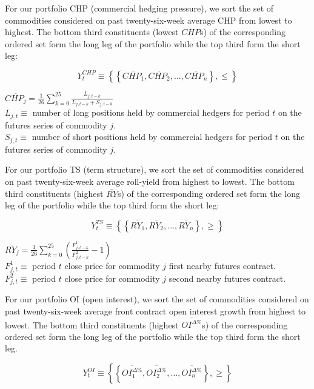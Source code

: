 \documentclass[
  authoryear,
  preprint,
  3p]{elsarticle}
\begin{document}
\medskip

For our portfolio CHP (commercial hedging pressure), we sort the set of
commodities considered on past twenty-six-week average CHP from lowest
to highest. The bottom third constituents (lowest \(\overline{CHP}\)s)
of the corresponding ordered set form the long leg of the portfolio
while the top third form the short leg:

\[Y_{t}^{CHP}\equiv\left \{ \left \{ \overline{CHP_{1}}, \overline{CHP_{2}}, ..., \overline{CHP_{n}} \right \}, \leq \right \}\]

\(\overline{CHP_{j}}=\frac{1}{26}\sum_{k=0}^{25}\frac{L_{j,t-k}}{L_{j,t-k}+S_{j,t-k}}\)\\
\(L_{j,t}\equiv\) number of long positions held by commercial hedgers
for period \(t\) on the futures series of commodity \(j\).\\
\(S_{j,t}\equiv\) number of short positions held by commercial hedgers
for period \(t\) on the futures series of commodity \(j\).

\medskip

For our portfolio TS (term structure), we sort the set of commodities
considered on past twenty-six-week average roll-yield from highest to
lowest. The bottom third constituents (highest \(\overline{RY}\)s) of
the corresponding ordered set form the long leg of the portfolio while
the top third form the short leg:

\[Y_{t}^{TS}\equiv\left \{ \left \{ \overline{RY_{1}}, \overline{RY_{2}}, ..., \overline{RY_{n}} \right \}, \geq \right \}\]

\(\overline{RY_{j}}=\frac{1}{26}\sum_{k=0}^{25}(\frac{F_{j,t-k}^{1}}{F_{j,t-k}^{2}} - 1)\)\\
\(F_{j,t}^{1}\equiv\) period \(t\) close price for commodity \(j\) first
nearby futures contract.\\
\(F_{j,t}^{2}\equiv\) period \(t\) close price for commodity \(j\)
second nearby futures contract.

\medskip

For our portfolio OI (open interest), we sort the set of commodities
considered on past twenty-six-week average front contract open interest
growth from highest to lowest. The bottom third constituents (highest
\(\overline{OI^{\Delta \%}}\)s) of the corresponding ordered set form
the long leg of the portfolio while the top third form the short leg.

\[Y_{t}^{OI}\equiv\left \{ \left \{ \overline{OI_{1}^{\Delta \%}}, \overline{OI_{2}^{\Delta \%}}, ..., \overline{OI_{n}^{\Delta \%}} \right \}, \geq \right \}\]
\end{document}
